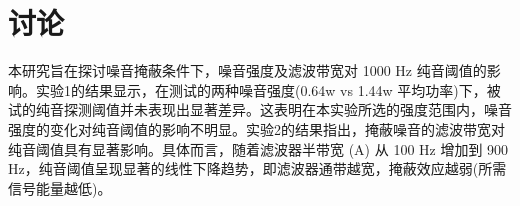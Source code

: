 \documentclass[jou,12pt,floatsintext]{apa7} %
\begin{document}
    
    
    
    


\section{讨论}

本研究旨在探讨噪音掩蔽条件下，噪音强度及滤波带宽对 1000 Hz 纯音阈值的影响。实验1的结果显示，在测试的两种噪音强度(0.64w vs 1.44w 平均功率)下，被试的纯音探测阈值并未表现出显著差异。这表明在本实验所选的强度范围内，噪音强度的变化对纯音阈值的影响不明显。实验2的结果指出，掩蔽噪音的滤波带宽对纯音阈值具有显著影响。具体而言，随着滤波器半带宽 (A) 从 100 Hz 增加到 900 Hz，纯音阈值呈现显著的线性下降趋势，即滤波器通带越宽，掩蔽效应越弱(所需信号能量越低)。
\end{document}
